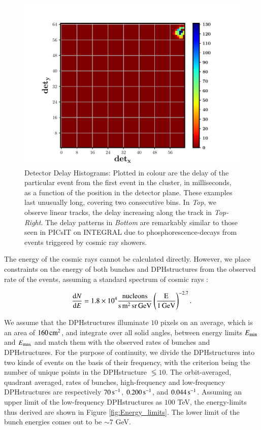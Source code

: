 \begin{figure}
\begin{center}
\includegraphics[scale=0.42]{Q3--merged_7861+7862}
\caption[Detector Delay Histograms showing patterns similar to INTEGRAL-PICsIT]{Detector Delay Histograms: Plotted in colour are the delay of the particular event from the first event in the cluster, in milliseconds, as a function of the position in the detector plane. These examples last unusually long, covering two consecutive bins. In \emph{Top}, we observe linear tracks, the delay increasing along the track in \emph{Top-Right}. The delay patterns in \emph{Bottom} are remarkably similar to those seen in PICsIT on INTEGRAL due to phosphorescence-decays from events triggered by cosmic ray showers.}
\label{fig:DDH}
\end{center}
\end{figure}


The energy of the cosmic rays cannot be calculated directly. However, we place constraints on the energy of both bunches and DPHstructures from the observed rate of the events, assuming a standard spectrum of cosmic rays :

\begin{equation}
\frac{{\rm d} N}{{\rm d} E} =  1.8 \times 10^4 \rm{\dfrac{nucleons}{s \, m^2 \, sr \, GeV}} \left( \frac{E}{1 \, \rm{GeV}} \right)^{-2.7}.
\label{eq:cosmic_ray_spectrum}
\end{equation}

We assume that the DPHstructures illuminate $10$ pixels on an average, which is an area of $160 \, \rm{cm^2}$, and integrate over all solid angles, between energy limits $E_{\rm{min}}$ and $E_{\rm{max}}$ and match them with the observed rates of bunches and DPHstructures. For the purpose of continuity, we divide the DPHstructures into two kinds of events on the basis of their frequency, with the criterion being the number of unique points in the DPHstructure $\lessgtr 10$. The orbit-averaged, quadrant averaged, rates of bunches, high-frequency and low-frequency DPHstructures are respectively $70 \, {\rm s^{-1}}$, $0.200 \, {\rm s^{-1}}$, and $0.044 \, {\rm s^{-1}}$. Assuming an upper limit of the low-frequency DPHstructures as $100$ TeV, the energy-limits thus derived are shown in Figure \ref{fig:Energy_limits}. The lower limit of the bunch energies comes out to be $\sim 7$ GeV.


